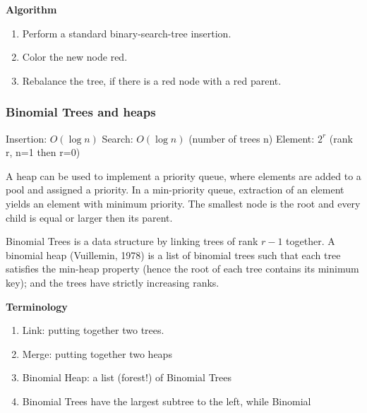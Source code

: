 \noindent\textbf{Algorithm}
\begin{enumerate}
\item  Perform a standard binary-search-tree insertion.
\item  Color the new node red.
\item  Rebalance the tree, if there is a red node with a red parent.
\end{enumerate}
\vspace{2mm}

\subsubsection{Binomial Trees and heaps}
Insertion: $O(\log{n})$                   \newline
Search: $O(\log{n})$  (number of trees n) \newline
Element: $2^r$  (rank r, n=1 then r=0)    \newline

A heap can be used to implement a priority queue, where elements are
added to a pool and assigned a priority. In a min-priority queue,
extraction of an element yields an element with minimum priority.
The smallest node is the root and every child is equal or larger then
its parent.

Binomial Trees is a data structure by linking trees of rank $r-1$ together.
A binomial heap (Vuillemin, 1978) is a list of binomial trees such that
each tree satisfies the min-heap property (hence the root of each tree contains its minimum key);
and the trees have strictly increasing ranks. \newline

\noindent\textbf{Terminology}
\begin{enumerate}
\item  Link: putting together two trees.
\item  Merge: putting together two heaps
\item  Binomial Heap: a list (forest!) of Binomial Trees
\item  Binomial Trees have the largest subtree to the left, while Binomial
\end{enumerate}
\newpage


